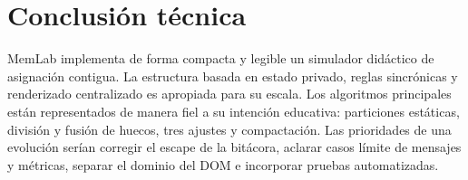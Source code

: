 \documentclass[11pt,a4paper]{article}
\begin{document}
\section{Conclusión técnica}

MemLab implementa de forma compacta y legible un simulador didáctico de asignación
contigua. La estructura basada en estado privado, reglas sincrónicas y renderizado
centralizado es apropiada para su escala. Los algoritmos principales están
representados de manera fiel a su intención educativa: particiones estáticas,
división y fusión de huecos, tres ajustes y compactación. Las prioridades de una
evolución serían corregir el escape de la bitácora, aclarar casos límite de mensajes
y métricas, separar el dominio del DOM e incorporar pruebas automatizadas.
\end{document}
